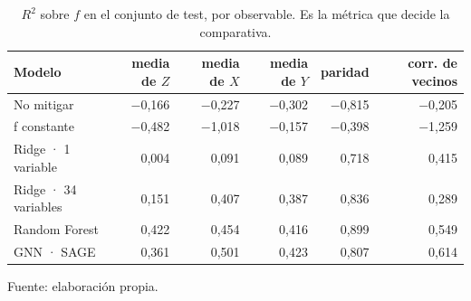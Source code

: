 \begin{table}[htbp]
    \centering
    {\footnotesize
    \begin{tabular}{@{}lrrrrr@{}}
        \toprule
        \textbf{Modelo} & \textbf{media de $Z$} & \textbf{media de $X$} & \textbf{media de $Y$} & \textbf{paridad} & \textbf{corr. de vecinos} \\
        \midrule
        No mitigar & $-$0,166 & $-$0,227 & $-$0,302 & $-$0,815 & $-$0,205 \\
        f constante & $-$0,482 & $-$1,018 & $-$0,157 & $-$0,398 & $-$1,259 \\
        Ridge · 1 variable & 0,004 & 0,091 & 0,089 & 0,718 & 0,415 \\
        Ridge · 34 variables & 0,151 & 0,407 & 0,387 & 0,836 & 0,289 \\
        Random Forest & 0,422 & 0,454 & 0,416 & 0,899 & 0,549 \\
        GNN · SAGE & 0,361 & 0,501 & 0,423 & 0,807 & 0,614 \\
        \bottomrule
    \end{tabular}}

    \caption{$R^2$ sobre $f$ en el conjunto de test, por observable. Es la métrica que decide la comparativa.}
    \label{tab:comparativa_r2}

    {\footnotesize Fuente: elaboración propia.}
\end{table}

